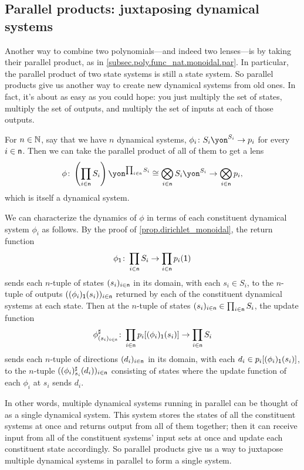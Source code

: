 \documentclass[Book-Poly]{subfiles}
\begin{document}
\subsection{Parallel products: juxtaposing dynamical systems}\label{subsec.poly.dyn_sys.new.par}

Another way to combine two polynomials---and indeed two lenses---is by taking their parallel product, as in \cref{subsec.poly.func_nat.monoidal.par}.
In particular, the parallel product of two state systems is still a state system.
So parallel products give us another way to create new dynamical systems from old ones.
In fact, it's about as easy as you could hope: you just multiply the set of states, multiply the set of outputs, and multiply the set of inputs at each of those outputs.

For $n\in\mathbb{N}$, say that we have $n$ dynamical systems, $\phi_i\colon S_i\yon^{S_i}\to p_i$ for every $i\in\mathsf{n}$.
Then we can take the parallel product of all of them to get a lens \[\phi\colon \left(\prod_{i\in\ord{n}}S_i\right)\yon^{\prod_{i\in\ord{n}}S_i}\iso\bigotimes_{i\in\ord{n}}S_i\yon^{S_i}\to\bigotimes_{i\in\ord{n}}p_i,\] which is itself a dynamical system.

We can characterize the dynamics of $\phi$ in terms of each constituent dynamical system $\phi_i$ as follows.
By the proof of \cref{prop.dirichlet_monoidal}, the return function \[\phi_{\textsf{1}}\colon \prod_{i\in\mathsf{n}}S_i\to\prod_{i\in\mathsf{n}}p_i(\textsf{1})\] sends each $n$-tuple of states $(s_i)_{i\in\mathsf{n}}$ in its domain, with each $s_i\in S_i$, to the $n$-tuple of outputs $((\phi_i)_{\textsf{1}}(s_i))_{i\in\mathsf{n}}$ returned by each of the constituent dynamical systems at each state.
Then at the $n$-tuple of states $(s_i)_{i\in\mathsf{n}}\in\prod_{i\in\mathsf{n}}S_i$, the update function \[\phi^\sharp_{(s_i)_{i\in\mathsf{n}}}\colon\prod_{i\in\mathsf{n}}p_i[(\phi_i)_{\textsf{1}}(s_i)]\to\prod_{i\in\mathsf{n}}S_i\] sends each $n$-tuple of directions $(d_i)_{i\in\mathsf{n}}$ in its domain, with each $d_i\in p_i[(\phi_i)_{\textsf{1}}(s_i)]$, to the $n$-tuple $((\phi_i)^\sharp_{s_i}(d_i))_{i\in\mathsf{n}}$ consisting of states where the update function of each $\phi_i$ at $s_i$ sends $d_i$.

In other words, multiple dynamical systems running in parallel can be thought of as a single dynamical system.
This system stores the states of all the constituent systems at once and returns output from all of them together; then it can receive input from all of the constituent systems' input sets at once and update each constituent state accordingly.
So parallel products give us a way to juxtapose multiple dynamical systems in parallel to form a single system.
\end{document}
